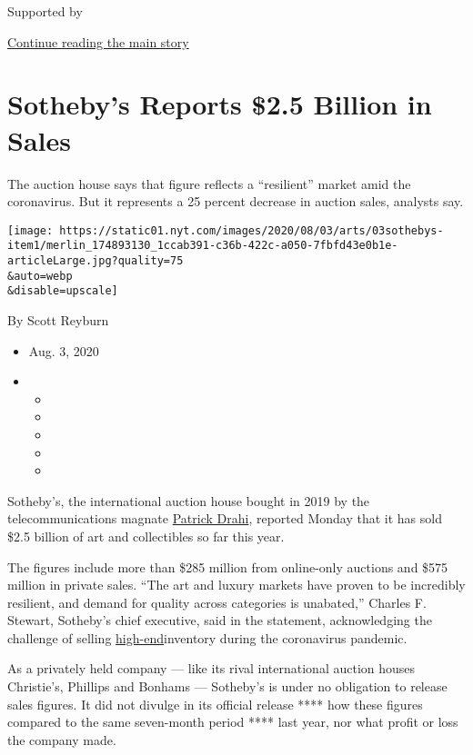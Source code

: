 Supported by

\protect\hyperlink{after-sponsor}{Continue reading the main story}

\hypertarget{sothebys-reports-25-billion-in-sales}{%
\section{Sotheby's Reports \$2.5 Billion in
Sales}\label{sothebys-reports-25-billion-in-sales}}

The auction house says that figure reflects a ``resilient'' market amid
the coronavirus. But it represents a 25 percent decrease in auction
sales, analysts say.

\texttt{[image: https://static01.nyt.com/images/2020/08/03/arts/03sothebys-item1/merlin\_174893130\_1ccab391-c36b-422c-a050-7fbfd43e0b1e-articleLarge.jpg?quality=75\\\&auto=webp\\\&disable=upscale]}

By Scott Reyburn

\begin{itemize}
\item
  Aug. 3, 2020
\item
  \begin{itemize}
  \item
  \item
  \item
  \item
  \item
  \end{itemize}
\end{itemize}

Sotheby's, the international auction house bought in 2019 by the
telecommunications magnate
\href{https://www.nytimes.com/2019/06/17/business/sothebys-patrick-drahi-bidfair.html}{Patrick
Drahi}, reported Monday that it has sold \$2.5 billion of art and
collectibles so far this year.

The figures include more than \$285 million from online-only auctions
and \$575 million in private sales. ``The art and luxury markets have
proven to be incredibly resilient, and demand for quality across
categories is unabated,'' Charles F. Stewart, Sotheby's chief executive,
said in the statement, acknowledging the challenge of selling
\href{https://www.nytimes.com/2020/07/10/your-money/auctions-wealth-coronavirus.html}{high-end}inventory
during the coronavirus pandemic.

As a privately held company --- like its rival international auction
houses Christie's, Phillips and Bonhams --- Sotheby's is under no
obligation to release sales figures. It did not divulge in its official
release **** how these figures compared to the same seven-month period
**** last year, nor what profit or loss the company made.


